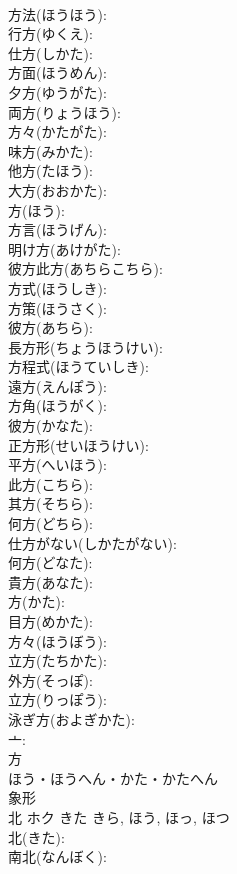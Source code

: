 \documentclass[8pt]{extreport}
\begin{document}
\begin{CJK}{UTF8}{min}
\\	方法(ほうほう): 
\\	行方(ゆくえ): 
\\	仕方(しかた): 
\\	方面(ほうめん): 
\\	夕方(ゆうがた): 
\\	両方(りょうほう): 
\\	方々(かたがた): 
\\	味方(みかた): 
\\	他方(たほう): 
\\	大方(おおかた): 
\\	方(ほう): 
\\	方言(ほうげん): 
\\	明け方(あけがた): 
\\	彼方此方(あちらこちら): 
\\	方式(ほうしき): 
\\	方策(ほうさく): 
\\	彼方(あちら): 
\\	長方形(ちょうほうけい): 
\\	方程式(ほうていしき): 
\\	遠方(えんぽう): 
\\	方角(ほうがく): 
\\	彼方(かなた): 
\\	正方形(せいほうけい): 
\\	平方(へいほう): 
\\	此方(こちら): 
\\	其方(そちら): 
\\	何方(どちら): 
\\	仕方がない(しかたがない): 
\\	何方(どなた): 
\\	貴方(あなた): 
\\	方(かた): 
\\	目方(めかた): 
\\	方々(ほうぼう): 
\\	立方(たちかた): 
\\	外方(そっぽ): 
\\	立方(りっぽう): 
\\	泳ぎ方(およぎかた): 
\\	亠: 
\\	方	
\\	ほう・ほうへん・かた・かたへん	
\\	象形 
\\	北	ホク	きた	きら, ほう, ほっ, ほつ	
\\	北(きた): 
\\	南北(なんぼく): 

\end{CJK}
\end{document}
